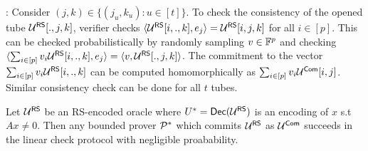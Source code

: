 : Consider $(j,k)\in \{(j_u,k_u):u\in [t]\}$. To check the
consistency of the opened tube $\mathcal{U}^{\mathsf{RS}}[.,j,k]$, verifier checks
$\langle \mathcal{U}^{\mathsf{RS}}[i,.,k],e_j\rangle=\mathcal{U}^{\mathsf{RS}}[i,j,k]$ for all $i\in [p]$. This can be
checked probabilistically by randomly sampling $v\in \mathbb{F}^p$ and checking
$\langle \sum_{i\in [p]}v_i\mathcal{U}^{\mathsf{RS}}[i,.,k],e_j\rangle=\langle v,\mathcal{U}^{\mathsf{RS}}[.,j,k]\rangle$.
The commitment to the vector $\sum_{i\in [p]}v_i\mathcal{U}^{\mathsf{RS}}[i,.,k]$ can be
computed homomorphically as $\sum_{i\in [p]}v_i\mathcal{U}^{\mathsf{Com}}[i,j]$. Similar
consistency check can be done for all $t$ tubes.

\begin{lemma}\label{lem:linchecksound}
Let $\mathcal{U}^{\mathsf{RS}}$ be an RS-encoded oracle where $U^\ast=\mathsf{Dec}(\mathcal{U}^{\mathsf{RS}})$ is
an encoding of $x$ s.t $Ax\neq 0$. Then any bounded prover $\mathcal{P}^\ast$ which
commits $\mathcal{U}^{\mathsf{RS}}$ as $\mathcal{U}^{\mathsf{Com}}$ succeeds in the linear check protocol with
negligible proabability.
\end{lemma}

